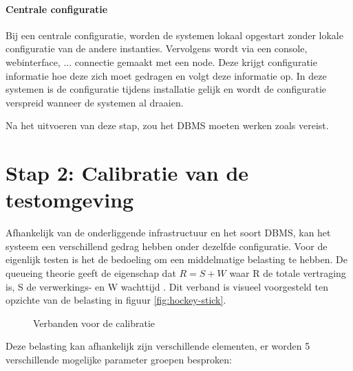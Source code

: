 \paragraph{Centrale configuratie} Bij een centrale configuratie, worden de systemen lokaal opgestart zonder lokale configuratie van de andere instanties. Vervolgens wordt via een console, webinterface, ... connectie gemaakt met een node. Deze krijgt configuratie informatie hoe deze zich moet gedragen en volgt deze informatie op. In deze systemen is de configuratie tijdens installatie gelijk en wordt de configuratie verspreid wanneer de systemen al draaien.  

Na het uitvoeren van deze stap, zou het DBMS moeten werken zoals vereist. 

\section{Stap 2: Calibratie van de testomgeving}
Afhankelijk van de onderliggende infrastructuur en het soort DBMS, kan het systeem een verschillend gedrag hebben onder dezelfde configuratie. Voor de eigenlijk testen is het de bedoeling om een middelmatige belasting te hebben. De queueing theorie geeft de eigenschap dat $R = S + W$ waar R de totale vertraging is, S de verwerkings- en W wachttijd \cite{millsap2003optimizing}. Dit verband is visueel voorgesteld ten opzichte van de belasting in figuur \ref{fig:hockey-stick}. 

\begin{figure}[ht!] 
\centering
	\hfill
	\caption{Verbanden voor de calibratie}
\end{figure}
Deze belasting kan afhankelijk zijn verschillende elementen, er worden 5 verschillende mogelijke parameter groepen besproken:

